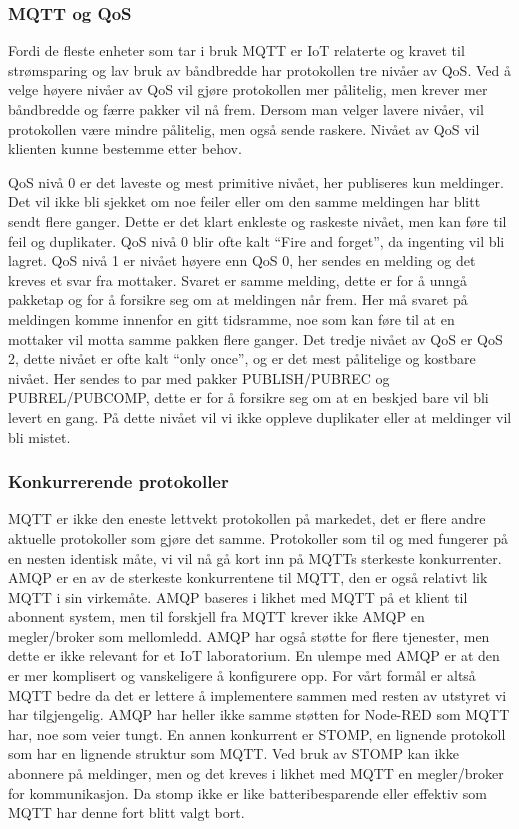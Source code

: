 \documentclass{article}
\begin{document}
\subsubsection{MQTT og QoS}

Fordi de fleste enheter som tar i bruk MQTT er IoT relaterte og kravet til strømsparing og lav bruk av båndbredde har protokollen tre nivåer av QoS. Ved å velge høyere nivåer av QoS vil gjøre protokollen mer pålitelig, men krever mer båndbredde og færre pakker vil nå frem. Dersom man velger lavere nivåer, vil protokollen være mindre pålitelig, men også sende raskere. Nivået av QoS vil klienten kunne bestemme etter behov. 

QoS nivå 0 er det laveste og mest primitive nivået, her publiseres kun meldinger. Det vil ikke bli sjekket om noe feiler eller om den samme meldingen har blitt sendt flere ganger. Dette er det klart enkleste og raskeste nivået, men kan føre til feil og duplikater. QoS nivå 0 blir ofte kalt “Fire and forget”, da ingenting vil bli lagret. QoS nivå 1 er nivået høyere enn QoS 0, her sendes en melding og det kreves et svar fra mottaker. Svaret er samme melding, dette er for å unngå pakketap og for å forsikre seg om at meldingen når frem. Her må svaret på meldingen komme innenfor en gitt tidsramme, noe som kan føre til at en mottaker vil motta samme pakken flere ganger. Det tredje nivået av QoS er QoS 2, dette nivået er ofte kalt “only once”, og er det mest pålitelige og kostbare nivået. Her sendes to par med pakker PUBLISH/PUBREC og PUBREL/PUBCOMP, dette er for å forsikre seg om at en beskjed bare vil bli levert en gang. På dette nivået vil vi ikke oppleve duplikater eller at meldinger vil bli mistet.

\subsubsection{Konkurrerende protokoller}

MQTT er ikke den eneste lettvekt protokollen på markedet, det er flere andre aktuelle protokoller som gjøre det samme. Protokoller som til og med fungerer på en nesten identisk måte, vi vil nå gå kort inn på MQTTs sterkeste konkurrenter. AMQP er en av de sterkeste konkurrentene til MQTT, den er også relativt lik MQTT i sin virkemåte. AMQP baseres i likhet med MQTT på et klient til abonnent system, men til forskjell fra MQTT krever ikke AMQP en megler/broker som mellomledd. AMQP har også støtte for flere tjenester, men dette er ikke relevant for et IoT laboratorium. En ulempe med AMQP er at den er mer komplisert og vanskeligere å konfigurere opp. For vårt formål er altså MQTT bedre da det er lettere å implementere sammen med resten av utstyret vi har tilgjengelig. AMQP har heller ikke samme støtten for Node-RED som MQTT har, noe som veier tungt. En annen konkurrent er STOMP, en lignende protokoll som har en lignende struktur som MQTT. Ved bruk av STOMP kan ikke abonnere på meldinger, men og det kreves i likhet med MQTT en megler/broker for kommunikasjon. Da stomp ikke er like batteribesparende eller effektiv som MQTT har denne fort blitt valgt bort.
\end{document}
